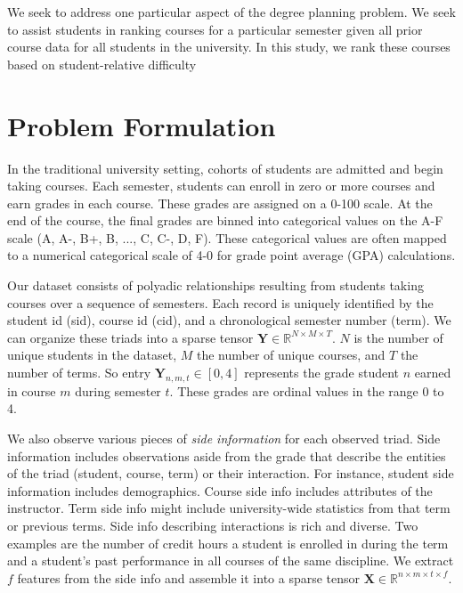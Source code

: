 \documentclass[10pt]{proc}
\begin{document}
We seek to address one particular aspect of the degree planning problem.
We seek to assist students in ranking courses for a particular semester given
all prior course data for all students in the university. In this study, we rank
these courses based on student-relative difficulty

\section{Problem Formulation}\label{problem-formulation}

In the traditional university setting, cohorts of students are admitted and
begin taking courses. Each semester, students can enroll in zero or more courses
and earn grades in each course. These grades are assigned on a 0-100 scale. At
the end of the course, the final grades are binned into categorical values on
the A-F scale (A, A-, B+, B, ..., C, C-, D, F). These categorical values are
often mapped to a numerical categorical scale of 4-0 for grade point average
(GPA) calculations.

Our dataset consists of polyadic relationships resulting from students taking
courses over a sequence of semesters. Each record is uniquely identified by the
student id (sid), course id (cid), and a chronological semester number (term).
We can organize these triads into a sparse tensor $\bm{Y} \in \mathbb{R}^{N
\times M \times T}$. $N$ is the number of unique students in the dataset,
$M$ the number of unique courses, and $T$ the number of terms. So entry
$\bm{Y}_{n,m,t} \in [0, 4]$ represents the grade student $n$ earned in course
$m$ during semester $t$. These grades are ordinal values in the range 0 to 4.

We also observe various pieces of \textit{side information} for each observed triad.
Side information includes observations aside from the grade that describe the
entities of the triad (student, course, term) or their interaction.  For
instance, student side information includes demographics. Course side info
includes attributes of the instructor. Term side info might include
university-wide statistics from that term or previous terms. Side info
describing interactions is rich and diverse. Two examples are the number of
credit hours a student is enrolled in during the term and a student's past
performance in all courses of the same discipline. We extract $f$ features from
the side info and assemble it into a sparse tensor $\bm{X} \in \mathbb{R}^{n
\times m \times t \times f}$.
\end{document}
